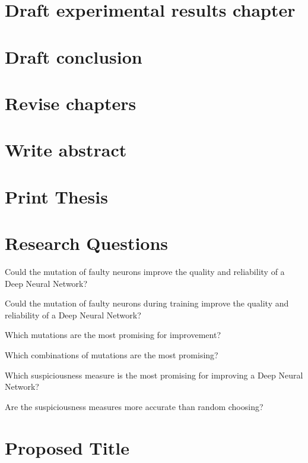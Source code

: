 \documentclass{article}
\begin{document}
\section{Draft experimental results chapter}
\section{Draft conclusion}
\section{Revise chapters}
\section{Write abstract}
\section{Print Thesis}

\section*{Research Questions}
\begin{questions}
    \item Could the mutation of faulty neurons improve the quality and reliability  of a Deep Neural Network?
    \item Could the mutation of faulty neurons during training improve the quality and reliability of a Deep Neural Network?
    \item Which mutations are the most promising for improvement?
    \item Which combinations of mutations are the most promising?
    \item Which suspiciousness measure is the most promising for improving a Deep Neural Network?
    \item Are the suspiciousness measures more accurate than random choosing?
\end{questions}
\section*{Proposed Title}
\printbibliography
\end{document}
